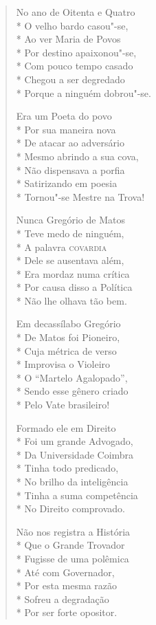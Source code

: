 \begin{verse}
No ano de Oitenta e Quatro\\*
O velho bardo casou"-se,\\*
Ao ver Maria de Povos\\*
Por destino apaixonou"-se,\\*
Com pouco tempo casado\\*
Chegou a ser degredado\\*
Porque a ninguém dobrou"-se.

Era um Poeta do povo\\*
Por sua maneira nova\\*
De atacar ao adversário\\*
Mesmo abrindo a sua cova,\\*
Não dispensava a porfia\\*
Satirizando em poesia\\*
Tornou"-se Mestre na Trova!

Nunca Gregório de Matos\\*
Teve medo de ninguém,\\*
A palavra \textsc{covardia}\\*
Dele se ausentava além,\\*
Era mordaz numa crítica\\*
Por causa disso a Política\\*
Não lhe olhava tão bem.

Em decassílabo Gregório\\*
De Matos foi Pioneiro,\\*
Cuja métrica de verso\\*
Improvisa o Violeiro\\*
O ``Martelo Agalopado'',\\*
Sendo esse gênero criado\\*
Pelo Vate brasileiro!

Formado ele em Direito\\*
Foi um grande Advogado,\\*
Da Universidade Coimbra\\*
Tinha todo predicado,\\*
No brilho da inteligência\\*
Tinha a suma competência\\*
No Direito comprovado.

Não nos registra a História\\*
Que o Grande Trovador\\*
Fugisse de uma polêmica\\*
Até com Governador,\\*
Por esta mesma razão\\*
Sofreu a degradação\\*
Por ser forte opositor.


\end{verse}
